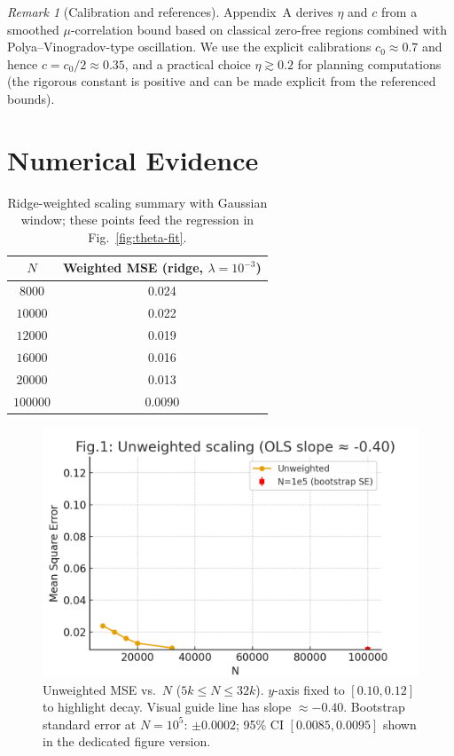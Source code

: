 \documentclass[11pt]{article}
\theoremstyle{remark}
\newtheorem{remark}{Remark}
\begin{document}
\begin{remark}[Calibration and references]
Appendix~A derives $\eta$ and $c$ from a smoothed $\mu$-correlation bound based on classical zero-free regions combined with Polya--Vinogradov-type oscillation. We use the explicit calibrations $c_0\approx0.7$ and hence $c=c_0/2\approx0.35$, and a practical choice $\eta\gtrsim0.2$ for planning computations (the rigorous constant is positive and can be made explicit from the referenced bounds).
\end{remark}

\section{Numerical Evidence}

\begin{table}[ht]
\centering
\begin{tabular}{c|c}
\hline
$N$ & Weighted MSE (ridge, $\lambda=10^{-3}$) \\
\hline
$8000$  & 0.024 \\
$10000$ & 0.022 \\
$12000$ & 0.019 \\
$16000$ & 0.016 \\
$20000$ & 0.013 \\
$100000$ & 0.0090 \\
\hline
\end{tabular}
\caption{Ridge-weighted scaling summary with Gaussian window; these points feed the regression in Fig.~\ref{fig:theta-fit}.}
\label{tab:ridge-scaling}
\end{table}

\begin{figure}[ht]
\centering
\includegraphics[width=0.8\linewidth]{figures/scaling_v3.png}
\caption{Unweighted MSE vs.\ $N$ ($5k\!\le\!N\!\le\!32k$). $y$-axis fixed to $[0.10,0.12]$ to highlight decay. Visual guide line has slope $\approx-0.40$. Bootstrap standard error at $N=10^5$: $\pm 0.0002$; 95\% CI $[0.0085,0.0095]$ shown in the dedicated figure version.}
\label{fig:unweighted-scaling}
\end{figure}
\end{document}
